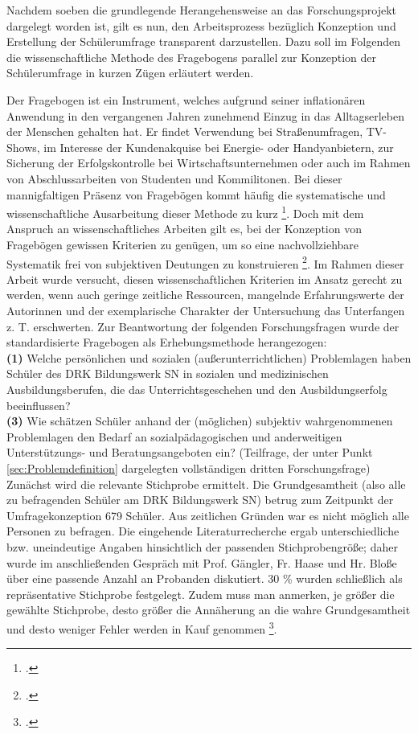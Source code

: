Nachdem soeben die grundlegende Herangehensweise an das Forschungsprojekt dargelegt worden ist, gilt es nun, den Arbeitsprozess bezüglich Konzeption und Erstellung der Schülerumfrage transparent darzustellen. Dazu soll im Folgenden die wissenschaftliche Methode des Fragebogens parallel zur Konzeption der Schülerumfrage in kurzen Zügen erläutert werden.

Der Fragebogen ist ein Instrument, welches aufgrund seiner inflationären Anwendung in den vergangenen Jahren zunehmend Einzug in das Alltagserleben der Menschen gehalten hat. Er findet Verwendung bei Straßenumfragen, TV-Shows, im Interesse der Kundenakquise bei Energie- oder Handyanbietern, zur Sicherung der Erfolgskontrolle bei Wirtschaftsunternehmen oder auch im Rahmen von Abschlussarbeiten von Studenten und Kommilitonen. Bei dieser mannigfaltigen Präsenz von Fragebögen kommt häufig die systematische und wissenschaftliche Ausarbeitung dieser Methode zu kurz \footcite[vgl.][11]{Kallus2010}. Doch mit dem Anspruch an wissenschaftliches Arbeiten gilt es, bei der Konzeption von Fragebögen gewissen Kriterien zu genügen, um so eine nachvollziehbare Systematik frei von subjektiven Deutungen zu konstruieren \footcite[vgl.][9]{Mayer2013}. Im Rahmen dieser Arbeit wurde versucht, diesen wissenschaftlichen Kriterien im Ansatz gerecht zu werden, wenn auch geringe zeitliche Ressourcen, mangelnde Erfahrungswerte der Autorinnen und der exemplarische Charakter der Untersuchung das Unterfangen z. T. erschwerten. Zur Beantwortung der folgenden Forschungsfragen wurde der standardisierte Fragebogen als Erhebungsmethode herangezogen:\\

\noindent
\textbf{(1)} Welche persönlichen und sozialen (außerunterrichtlichen) Problemlagen haben Schüler des DRK Bildungswerk SN in sozialen und medizinischen Ausbildungsberufen, die das Unterrichtsgeschehen und den Ausbildungserfolg beeinflussen?\\

\noindent
\textbf{(3)} Wie schätzen Schüler anhand der (möglichen) subjektiv wahrgenommenen Problemlagen den Bedarf an sozialpädagogischen und anderweitigen Unterstützungs- und Beratungsangeboten ein? (Teilfrage, der unter Punkt \ref{sec:Problemdefinition} dargelegten vollständigen dritten Forschungsfrage)\\

\noindent
Zunächst wird die relevante Stichprobe ermittelt. Die Grundgesamtheit (also alle zu befragenden Schüler am DRK Bildungswerk SN) betrug zum Zeitpunkt der Umfragekonzeption 679 Schüler. Aus zeitlichen Gründen war es nicht möglich alle Personen zu befragen. Die eingehende Literaturrecherche ergab unterschiedliche bzw. uneindeutige Angaben hinsichtlich der passenden Stichprobengröße; daher wurde im anschließenden Gespräch mit Prof. Gängler, Fr. Haase und Hr. Bloße über eine passende Anzahl an Probanden diskutiert. 30 \% wurden schließlich als repräsentative Stichprobe festgelegt. Zudem muss man anmerken, je größer die gewählte Stichprobe, desto größer die Annäherung an die wahre Grundgesamtheit und desto weniger Fehler werden in Kauf genommen \footcite[vgl.][65f]{Mayer2013}. 

